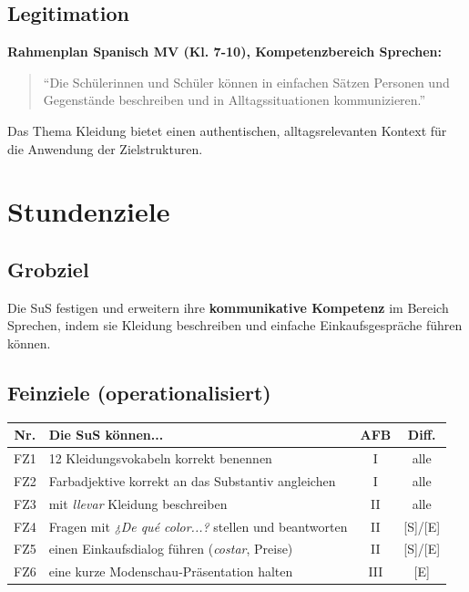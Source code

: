 \documentclass[11pt,a4paper]{article}
\begin{document}
\subsection{Legitimation}
\textbf{Rahmenplan Spanisch MV (Kl. 7-10), Kompetenzbereich Sprechen:}
\begin{quote}
``Die Schülerinnen und Schüler können in einfachen Sätzen Personen und Gegenstände beschreiben und in Alltagssituationen kommunizieren.''
\end{quote}

Das Thema Kleidung bietet einen authentischen, alltagsrelevanten Kontext für die Anwendung der Zielstrukturen.

\section{Stundenziele}

\subsection{Grobziel}
Die SuS festigen und erweitern ihre \textbf{kommunikative Kompetenz} im Bereich Sprechen, indem sie Kleidung beschreiben und einfache Einkaufsgespräche führen können.

\subsection{Feinziele (operationalisiert)}
\begin{tabular}{|c|p{8cm}|c|c|}
\hline
\textbf{Nr.} & \textbf{Die SuS können...} & \textbf{AFB} & \textbf{Diff.} \\
\hline
FZ1 & 12 Kleidungsvokabeln korrekt benennen & I & alle \\
\hline
FZ2 & Farbadjektive korrekt an das Substantiv angleichen & I & alle \\
\hline
FZ3 & mit \textit{llevar} Kleidung beschreiben & II & alle \\
\hline
FZ4 & Fragen mit \textit{¿De qué color...?} stellen und beantworten & II & [S]/[E] \\
\hline
FZ5 & einen Einkaufsdialog führen (\textit{costar}, Preise) & II & [S]/[E] \\
\hline
FZ6 & eine kurze Modenschau-Präsentation halten & III & [E] \\
\hline
\end{tabular}
\end{document}
